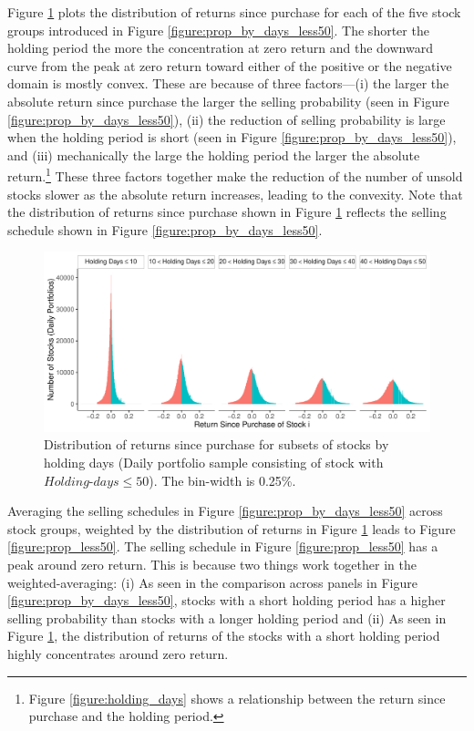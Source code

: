 \documentclass[11pt, a4paper]{article}
\begin{document}
Figure \ref{figure:dist_ret_by_days_less50} plots the distribution of returns since purchase for each of the five stock groups introduced in Figure \ref{figure:prop_by_days_less50}. The shorter the holding period the more the concentration at zero return and the downward curve from the peak at zero return toward either of the positive or the negative domain is mostly convex. These are because of three factors---(i) the larger the absolute return since purchase the larger the selling probability (seen in Figure \ref{figure:prop_by_days_less50}), (ii) the reduction of selling probability is large when the holding period is short (seen in Figure \ref{figure:prop_by_days_less50}), and (iii) mechanically the large the holding period the larger the absolute return.\footnote{Figure \ref{figure:holding_days} shows a relationship between the return since purchase and the holding period.} These three factors together make the reduction of the number of unsold stocks slower as the absolute return increases, leading to the convexity. Note that the distribution of returns since purchase shown in Figure \ref{figure:dist_ret_by_days_less50} reflects the selling schedule shown in Figure \ref{figure:prop_by_days_less50}. 

\begin{figure}[H]
	\centering
	\includegraphics[width=1\columnwidth]{barc_hist_return_daily_less50_3.pdf}
	\caption{\small Distribution of returns since purchase for subsets of stocks by holding days (Daily portfolio sample consisting of stock with $Holding\mbox{-}days\leq50$). The bin-width is 0.25\%.}
	\label{figure:dist_ret_by_days_less50}
\end{figure}


Averaging the selling schedules in Figure \ref{figure:prop_by_days_less50} across stock groups, weighted by the distribution of returns in Figure \ref{figure:dist_ret_by_days_less50} leads to Figure \ref{figure:prop_less50}. 
The selling schedule in Figure \ref{figure:prop_less50} has a peak around zero return. This is because two things work together in the weighted-averaging: (i) As seen in the comparison across panels in Figure \ref{figure:prop_by_days_less50}, stocks with a short holding period has a higher selling probability than stocks with a longer holding period and (ii) As seen in Figure \ref{figure:dist_ret_by_days_less50}, the distribution of returns of the stocks with a short holding period highly concentrates around zero return. 
\end{document}
